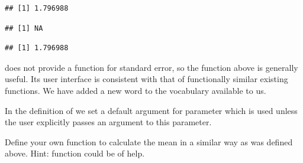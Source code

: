 \documentclass[krantz2]{krantz}\usepackage{knitr}%
\begin{document}
\begin{knitrout}\footnotesize
{}\color{fgcolor}\begin{kframe}
\begin{alltt}
 \hlkwb{<-} \hlstd{(}\hlstd{,} \hlstd{,} \hlstd{,} \hlopt{-}\hlstd{)}
 \hlkwb{<-}  \hlstd{)}
\hlstd{(} 
\end{alltt}
\begin{verbatim}
## [1] 1.796988
\end{verbatim}
\begin{alltt}
\hlstd{(} 
\end{alltt}
\begin{verbatim}
## [1] NA
\end{verbatim}
\begin{alltt}
\hlstd{(}   \hlstd{=} \hlstd{)}
\end{alltt}
\begin{verbatim}
## [1] 1.796988
\end{verbatim}
\end{kframe}
\end{knitrout}

\Rlang does not provide a function for standard error, so the function above is generally useful. Its user interface is consistent with that of functionally similar existing functions. We have added a new word to the \Rlang vocabulary available to us.

In the definition of  we set a default argument for parameter  which is used unless the user explicitly passes an argument to this parameter.



\begin{playground}
Define your own function to calculate the mean in a similar way as  was defined above. Hint: function  could be of help.
\end{playground}
\end{document}
